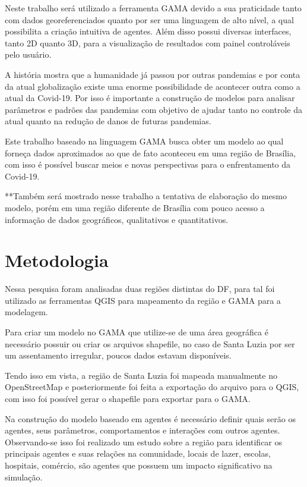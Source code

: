 Neste trabalho será utilizado a ferramenta GAMA devido a sua praticidade tanto com dados georeferenciados quanto por ser uma linguagem de alto nível, a qual possibilita a criação intuitiva de agentes. Além disso possui diversas interfaces, tanto 2D quanto 3D, para a visualização de resultados com painel controláveis pelo usuário.

A história mostra que a humanidade já passou por outras pandemias e por conta da atual globalização existe uma enorme possibilidade de acontecer outra como a atual da Covid-19. Por isso é importante a construção de modelos para analisar parâmetros e padrões das pandemias com objetivo de ajudar tanto no controle da atual quanto na redução de danos de futuras pandemias. 

Este trabalho baseado na linguagem GAMA busca obter um modelo ao qual forneça dados aproximados ao que de fato aconteceu em uma região de Brasília, com isso é possível buscar meios e novas perspectivas para o enfrentamento da Covid-19.

**Também será mostrado nesse trabalho a tentativa de elaboração do mesmo modelo, porém em uma região diferente de Brasília com pouco acesso a informação de dados geográficos, qualitativos e quantitativos.


\section{Metodologia}%

Nessa pesquisa foram analisadas duas regiões distintas do DF, para tal foi utilizado as ferramentas QGIS para mapeamento da região e GAMA para a modelagem. 

Para criar um modelo no GAMA que utilize-se de uma área geográfica é necessário possuir ou criar os arquivos shapefile, no caso de Santa Luzia por ser um assentamento irregular, poucos dados estavam disponíveis.

Tendo isso em vista, a região de Santa Luzia foi mapeada manualmente no OpenStreetMap e posteriormente foi feita a exportação do arquivo para o QGIS, com isso foi possível gerar o shapefile para exportar para o GAMA. 

Na construção do modelo baseado em agentes é necessário definir quais serão os agentes, seus parâmetros, comportamentos e interações com outros agentes. Observando-se isso foi realizado um estudo sobre a região para identificar os principais agentes e suas relações na comunidade, locais de lazer, escolas, hospitais, comércio, são agentes que possuem um impacto significativo na simulação.

